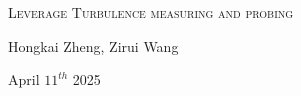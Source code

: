 \documentclass[aspectratio=169]{beamer}
\begin{document}
\begin{frame}[c]\frametitle{}

    \vspace{15mm}
    \begin{center}
    \Large{\textsc{
    Leverage Turbulence measuring and probing
    }}
    \end{center}
    \vspace{10mm}
    \begin{center}
    Hongkai Zheng, Zirui Wang
    \end{center}

    \vspace{0mm}
    \begin{center}
    April $11^{th}$ 2025
    \end{center}
\end{frame}
\end{document}
